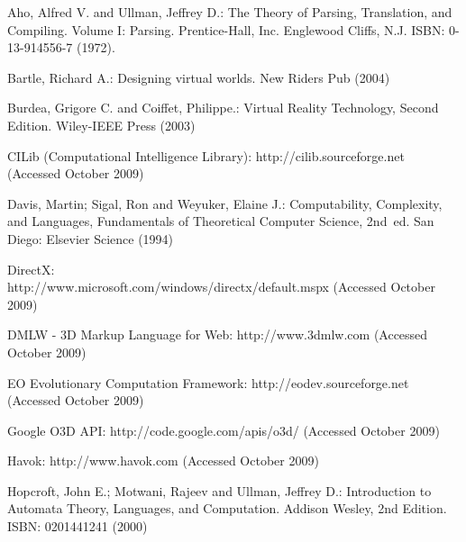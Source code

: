 \documentclass[twocolumn]{svjour3}
\begin{document}

%
%

\begin{thebibliography}{0}

Aho, Alfred V. and Ullman, Jeffrey D.:
The Theory of Parsing, Translation, and Compiling. Volume I: Parsing.
Prentice-Hall, Inc. Englewood Cliffs, N.J. ISBN: 0-13-914556-7 (1972).


Bartle, Richard A.:
Designing virtual worlds.
New Riders Pub (2004)

Burdea, Grigore C. and Coiffet, Philippe.:
Virtual Reality Technology, Second Edition.
Wiley-IEEE Press (2003)

\begin{flushleft}
CILib (Computational Intelligence Library):
http://cilib.sourceforge.net
(Accessed October 2009)
\end{flushleft}

Davis, Martin; Sigal, Ron and Weyuker, Elaine J.:
Computability, Complexity, and Languages, Fundamentals of Theoretical Computer Science, 2nd~ed.
San Diego: Elsevier Science (1994)

DirectX: \\
http://www.microsoft.com/windows/directx/default.mspx
(Accessed October 2009)

\begin{flushleft}
DMLW - 3D Markup Language for Web:
http://www.3dmlw.com
(Accessed October 2009)
\end{flushleft}

\begin{flushleft}
EO Evolutionary Computation Framework:
http://eodev.sourceforge.net
(Accessed October 2009)
\end{flushleft}

Google O3D API:
http://code.google.com/apis/o3d/
(Accessed October 2009)

Havok:
http://www.havok.com
(Accessed October 2009)

Hopcroft, John E.; Motwani, Rajeev and Ullman, Jeffrey D.:
Introduction to Automata Theory, Languages, and Computation.
Addison Wesley, 2nd Edition. ISBN: 0201441241 (2000)


\end{thebibliography}
\end{document}
